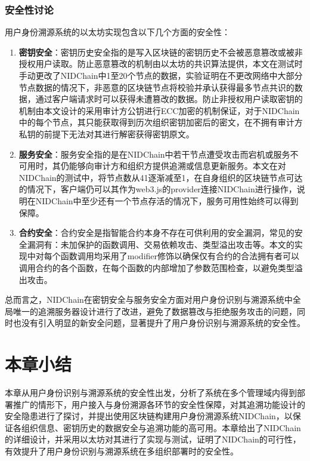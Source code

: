       \subsubsection{安全性讨论}
      \label{NIDTGA_Security:implement:test:security}
      用户身份溯源系统的以太坊实现包含以下几个方面的安全性：
      \begin{enumerate}[1{)}]
        \item \textbf{密钥安全}：密钥历史安全指的是写入区块链的密钥历史不会被恶意篡改或被非授权用户读取。防止恶意篡改的机制由以太坊的共识算法提供，本文在测试时手动更改了NIDChain中1至20个节点的数据，实验证明在不更改网络中大部分节点数据的情况下，非恶意的区块链节点将校验并承认获得最多节点共识的数据，通过客户端请求时可以获得未遭篡改的数据。防止非授权用户读取密钥的机制由本文设计的采用审计方公钥进行ECC加密的机制保证，对于NIDChain中的每个节点，其只能获取得到历次组织密钥加密后的密文，在不拥有审计方私钥的前提下无法对其进行解密获得密钥原文。
        \item \textbf{服务安全}：服务安全指的是在NIDChain中若干节点遭受攻击而宕机或服务不可用时，其仍能够向审计方和组织方提供追溯或信息更新服务。本文在对NIDChain的测试中，将节点数从41逐渐减至1，在自身组织的区块链节点可达的情况下，客户端仍可以其作为web3.js的provider连接NIDChain进行操作，说明在NIDChain中至少还有一个节点存活的情况下，服务可用性始终可以得到保障。
        \item \textbf{合约安全}：合约安全是指智能合约本身不存在可供利用的安全漏洞，常见的安全漏洞有：未加保护的函数调用、交易依赖攻击、类型溢出攻击等。本文的实现中对每个函数调用均采用了modifier修饰以确保仅有合约的合法拥有者可以调用合约的各个函数，在每个函数的内部增加了参数范围检查，以避免类型溢出攻击。
      \end{enumerate}

      总而言之，NIDChain在密钥安全与服务安全方面对用户身份识别与溯源系统中全局唯一的追溯服务器设计进行了改进，避免了数据篡改与拒绝服务攻击的问题，同时也没有引入明显的新安全问题，显著提升了用户身份识别与溯源系统的安全性。

  \section{本章小结}
  \label{NIDTGA_Security:summary}
  本章从用户身份识别与溯源系统的安全性出发，分析了系统在多个管理域内得到部署推广的情形下，用户接入与身份溯源各环节的安全性保障，对其追溯功能设计的安全隐患进行了探讨，并提出使用区块链构建用户身份溯源系统NIDChain，以保证各组织信息、密钥历史的数据安全与追溯功能的高可用。本章给出了NIDChain的详细设计，并采用以太坊对其进行了实现与测试，证明了NIDChain的可行性，有效提升了用户身份识别与溯源系统在多组织部署时的安全性。
